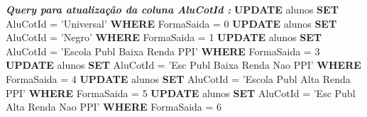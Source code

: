 \noindent \textbf{\textit{Query para atualização da coluna \textit{AluCotId} :}} \newline
\textbf{UPDATE} alunos \textbf{SET} AluCotId = 'Universal' \textbf{WHERE} FormaSaida = 0 \newline
\textbf{UPDATE} alunos \textbf{SET} AluCotId = 'Negro' \textbf{WHERE} FormaSaida = 1 \newline
\textbf{UPDATE} alunos \textbf{SET} AluCotId = 'Escola Publ Baixa Renda PPI' \textbf{WHERE} FormaSaida = 3 \newline
\textbf{UPDATE} alunos \textbf{SET} AluCotId = 'Esc Publ Baixa Renda Nao PPI' \textbf{WHERE} FormaSaida = 4 \newline
\textbf{UPDATE} alunos \textbf{SET} AluCotId = 'Escola Publ Alta Renda PPI' \textbf{WHERE} FormaSaida = 5 \newline
\textbf{UPDATE} alunos \textbf{SET} AluCotId = 'Esc Publ Alta Renda Nao PPI' \textbf{WHERE} FormaSaida = 6 \newline
